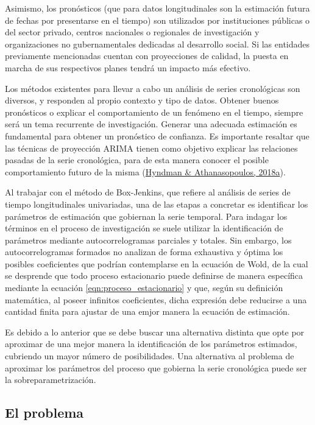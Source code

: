 \documentclass[
]{article}
\begin{document}
Asimismo, los pronósticos (que para datos longitudinales son la
estimación futura de fechas por presentarse en el tiempo) son utilizados
por instituciones públicas o del sector privado, centros nacionales o
regionales de investigación y organizaciones no gubernamentales
dedicadas al desarrollo social. Si las entidades previamente mencionadas
cuentan con proyecciones de calidad, la puesta en marcha de sus
respectivos planes tendrá un impacto más efectivo.

Los métodos existentes para llevar a cabo un análisis de series
cronológicas son diversos, y responden al propio contexto y tipo de
datos. Obtener buenos pronósticos o explicar el comportamiento de un
fenómeno en el tiempo, siempre será un tema recurrente de investigación.
Generar una adecuada estimación es fundamental para obtener un
pronóstico de confianza. Es importante resaltar que las técnicas de
proyección ARIMA tienen como objetivo explicar las relaciones pasadas de
la serie cronológica, para de esta manera conocer el posible
comportamiento futuro de la misma
(\protect\hyperlink{ref-hyndman2018forecasting}{Hyndman \&
Athanasopoulos, 2018a}).

Al trabajar con el método de Box-Jenkins, que refiere al análisis de
series de tiempo longitudinales univariadas, una de las etapas a
concretar es identificar los parámetros de estimación que gobiernan la
serie temporal. Para indagar los términos en el proceso de investigación
se suele utilizar la identificación de parámetros mediante
autocorrelogramas parciales y totales. Sin embargo, los
autocorrelogramas formados no analizan de forma exhaustiva y óptima los
posibles coeficientes que podrían contemplarse en la ecuación de Wold,
de la cual se desprende que todo proceso estacionario puede definirse de
manera específica mediante la ecuación \ref{eqn:proceso_estacionario} y
que, según su definición matemática, al poseer infinitos coeficientes,
dicha expresión debe reducirse a una cantidad finita para ajustar de una
emjor manera la ecuación de estimación.

Es debido a lo anterior que se debe buscar una alternativa distinta que
opte por aproximar de una mejor manera la identificación de los
parámetros estimados, cubriendo un mayor número de posibilidades. Una
alternativa al problema de aproximar los parámetros del proceso que
gobierna la serie cronológica puede ser la sobreparametrización.

\subsection{El problema}
\end{document}
